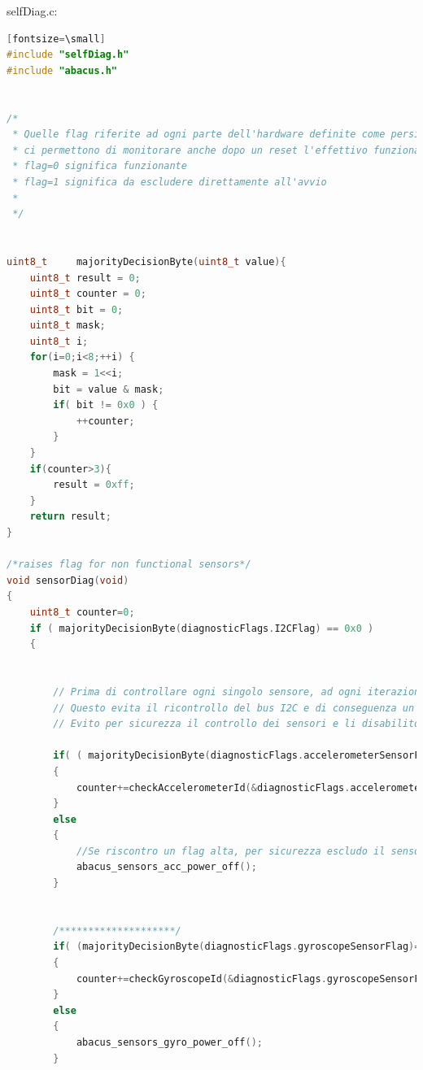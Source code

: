\documentclass[LaM,binding=0.6cm]{../sapthesis}
\begin{document}
selfDiag.c:
\begin{lstlisting}[language=c][fontsize=\small]
#include "selfDiag.h"
#include "abacus.h"


/*
 * Quelle flag riferite ad ogni parte dell'hardware definite come persistent
 * ci permettono di monitorare anche dopo un reset l'effettivo funzionamento.
 * flag=0 significa funzionante
 * flag=1 significa da escludere direttamente all'avvio
 *
 */


uint8_t     majorityDecisionByte(uint8_t value){
    uint8_t result = 0;
    uint8_t counter = 0;
    uint8_t bit = 0;
    uint8_t mask;
    uint8_t i;
    for(i=0;i<8;++i) {
        mask = 1<<i;
        bit = value & mask;
        if( bit != 0x0 ) {
            ++counter;
        }
    }
    if(counter>3){
        result = 0xff;
    }
    return result;
}

/*raises flag for non functional sensors*/
void sensorDiag(void)
{
    uint8_t counter=0;
    if ( majorityDecisionByte(diagnosticFlags.I2CFlag) == 0x0 )
    {


        // Prima di controllare ogni singolo sensore, ad ogni iterazione si esegue un controllo sul bus I2C condiviso tra tutti i sottosistemi interrogati.
        // Questo evita il ricontrollo del bus I2C e di conseguenza un possibile overflow al contatore (verrebbe sommato per n volte 0x80
        // Evito per sicurezza il controllo dei sensori e li disabilito a priori nel caso in cui il bus non sia funzionante

        if( ( majorityDecisionByte(diagnosticFlags.accelerometerSensorFlag) == 0x0) )
        {
            counter+=checkAccelerometerId(&diagnosticFlags.accelerometerSensorFlag);
        }
        else
        {
            //Se riscontro un flag alta, per sicurezza escludo il sensore
            abacus_sensors_acc_power_off();
        }


        /********************/
        if( (majorityDecisionByte(diagnosticFlags.gyroscopeSensorFlag)==0x0) )
        {
            counter+=checkGyroscopeId(&diagnosticFlags.gyroscopeSensorFlag);
        }
        else
        {
            abacus_sensors_gyro_power_off();
        }


\end{lstlisting}
\end{document}
